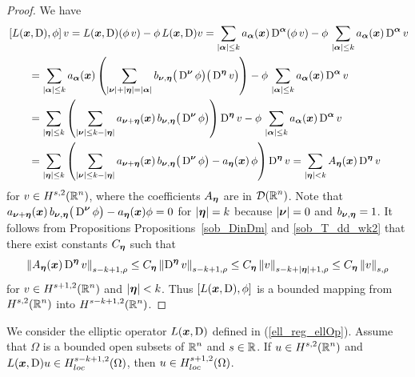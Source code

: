 \begin{proof}
We have
\begin{align*}
&\left[ L({\bm{x}},\operatorname{D}), \phi\right] v
= L({\bm{x}},\operatorname{D}) (\phi\, v) - \phi\, L({\bm{x}},\operatorname{D}) v
= \sum_{|{\bm{\alpha}}|\leq k} a_{{\bm{\alpha}}}({\bm{x}})
\operatorname{D}^{{\bm{\alpha}}} (\phi\, v)
- \phi\, \sum_{|{\bm{\alpha}}|\leq k} a_{{\bm{\alpha}}}({\bm{x}})
\operatorname{D}^{{\bm{\alpha}}} v \\
&\qquad = \sum_{|{\bm{\alpha}}|\leq k} a_{{\bm{\alpha}}}({\bm{x}})
\left( \sum_{|{\bm{\nu}}|+|{\bm{\eta}}|=|{\bm{\alpha}}|}
b_{{\bm{\nu}},{\bm{\eta}}}
\big(\operatorname{D}^{{\bm{\nu}}} \phi\big)\big(\operatorname{D}^{{\bm{\eta}}} v\big) \right)
- \phi\, \sum_{|{\bm{\alpha}}|\leq k} a_{{\bm{\alpha}}}({\bm{x}})
\operatorname{D}^{{\bm{\alpha}}} v \\
&\qquad = \sum_{|{\bm{\eta}}|\leq k} \left(
\sum_{|{\bm{\nu}}|\leq k-|{\bm{\eta}}|} 
a_{{\bm{\nu}}+{\bm{\eta}}}({\bm{x}})\, b_{{\bm{\nu}},{\bm{\eta}}}
\big(\operatorname{D}^{{\bm{\nu}}} \phi\big) \right) \operatorname{D}^{{\bm{\eta}}} v
- \phi\, \sum_{|{\bm{\alpha}}|\leq k} a_{{\bm{\alpha}}}({\bm{x}})
\operatorname{D}^{{\bm{\alpha}}} v \\
&\qquad =\sum_{|{\bm{\eta}}|\leq k} \left(
\sum_{|{\bm{\nu}}|\leq k-|{\bm{\eta}}|} 
a_{{\bm{\nu}}+{\bm{\eta}}}({\bm{x}})\, b_{{\bm{\nu}},{\bm{\eta}}}
\big(\operatorname{D}^{{\bm{\nu}}} \phi\big) - a_{{\bm{\eta}}}({\bm{x}})\,\phi \right)
\operatorname{D}^{{\bm{\eta}}} v
= \sum_{|{\bm{\eta}}|< k} A_{{\bm{\eta}}}({\bm{x}}) \operatorname{D}^{{\bm{\eta}}} v
\end{align*}
for $\displaystyle v \in H^{s,2}(\mathbb{R}^n)$,
where the coefficients $A_{{\bm{\eta}}}$ are in $\displaystyle \mathcal{D}(\mathbb{R}^n)$.
Note that
$\displaystyle a_{{\bm{\nu}}+{\bm{\eta}}}({\bm{x}})\, b_{{\bm{\nu}},{\bm{\eta}}}
\big(\operatorname{D}^{{\bm{\nu}}} \phi\big) - a_{{\bm{\eta}}}({\bm{x}})\phi = 0$ for
$|{\bm{\eta}}| = k$ because $|{\bm{\nu}}|=0$ and
$b_{{\bm{\nu}},{\bm{\eta}}} = 1$.
It follows from Propositions Propositions~\ref{sob_DinDm} and
\ref{sob_T_dd_wk2} that there exist
constants $C_{{\bm{\eta}}}$ such that
\begin{equation} \label{ellRegInLem1Eq1}
\left\| A_{{\bm{\eta}}}({\bm{x}}) \operatorname{D}^{{\bm{\eta}}} v \right\|_{s-k+1,\rho}
\leq C_{{\bm{\eta}}} \left\| \operatorname{D}^{{\bm{\eta}}} v \right\|_{s-k+1,\rho}
\leq C_{{\bm{\eta}}} \left\| v \right\|_{s-k+|{\bm{\eta}}|+1,\rho}
\leq C_{{\bm{\eta}}} \left\| v \right\|_{s,\rho}
\end{equation}
for $\displaystyle v \in H^{s+1,2}(\mathbb{R}^n)$ and $|{\bm{\eta}}|<k$.  Thus
$\left[ L({\bm{x}},\operatorname{D}), \phi\right]$ is a bounded mapping from
$\displaystyle H^{s,2}(\mathbb{R}^n)$ into $\displaystyle H^{s-k+1,2}(\mathbb{R}^n)$.
\end{proof}

\begin{lemma} \label{ell_reg_in_lem2}
We consider the elliptic operator $L({\bm{x}},\operatorname{D})$ defined in
(\ref{ell_reg_ellOp}).  Assume that $\Omega$ is a bounded open subsets of
$\displaystyle \mathbb{R}^n$ and $s\in \mathbb{R}$.  If $\displaystyle u\in H^{s,2}(\mathbb{R}^n)$
and $\displaystyle L({\bm{x}},\operatorname{D}) u \in H^{s-k+1,2}_{loc}(\Omega)$, then
$\displaystyle u \in H^{s+1,2}_{loc}(\Omega)$.
\end{lemma}

